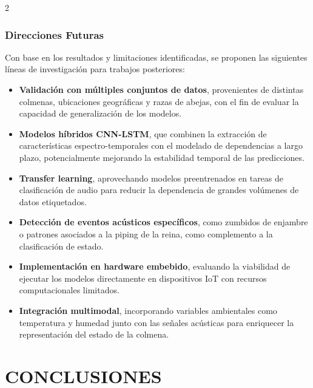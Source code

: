 \documentclass[12pt]{report}
\newenvironment{tightmulticols}{%
  \begin{multicols}{2}
  \setlength{\parskip}{1.2pt}
  \linespread{1}\selectfont
}{%
  \end{multicols}
}
\begin{document}
\begin{tightmulticols}
\subsection{Direcciones Futuras}

\noindent Con base en los resultados y limitaciones identificadas, se proponen las siguientes líneas de investigación para trabajos posteriores:

\begin{itemize}
    \item \textbf{Validación con múltiples conjuntos de datos}, provenientes de distintas colmenas, ubicaciones geográficas y razas de abejas, con el fin de evaluar la capacidad de generalización de los modelos.
    \item \textbf{Modelos híbridos CNN-LSTM}, que combinen la extracción de características espectro-temporales con el modelado de dependencias a largo plazo, potencialmente mejorando la estabilidad temporal de las predicciones.
    \item \textbf{Transfer learning}, aprovechando modelos preentrenados en tareas de clasificación de audio para reducir la dependencia de grandes volúmenes de datos etiquetados.
    \item \textbf{Detección de eventos acústicos específicos}, como zumbidos de enjambre o patrones asociados a la piping de la reina, como complemento a la clasificación de estado.
    \item \textbf{Implementación en hardware embebido}, evaluando la viabilidad de ejecutar los modelos directamente en dispositivos IoT con recursos computacionales limitados.
    \item \textbf{Integración multimodal}, incorporando variables ambientales como temperatura y humedad junto con las señales acústicas para enriquecer la representación del estado de la colmena.
\end{itemize}

\end{tightmulticols}

\pagebreak
\chapter{CONCLUSIONES}

\end{document}
